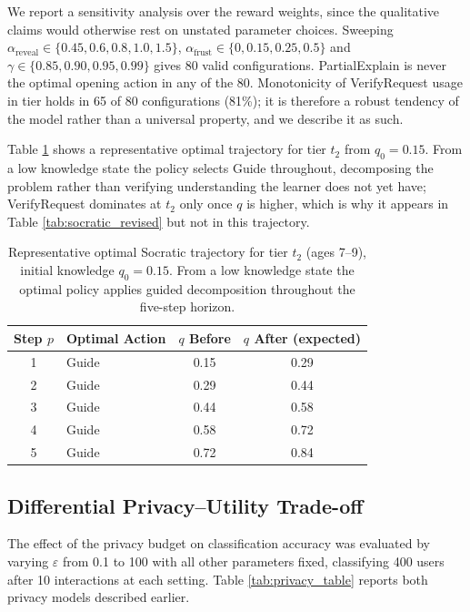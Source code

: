 \documentclass[fleqn,10pt]{wlscirep}
\begin{document}
We report a sensitivity analysis over the reward weights, since the qualitative claims would otherwise rest on unstated parameter choices. Sweeping $\alpha_{\text{reveal}} \in \{0.45, 0.6, 0.8, 1.0, 1.5\}$, $\alpha_{\text{frust}} \in \{0, 0.15, 0.25, 0.5\}$ and $\gamma \in \{0.85, 0.90, 0.95, 0.99\}$ gives 80 valid configurations. PartialExplain is never the optimal opening action in any of the 80. Monotonicity of VerifyRequest usage in tier holds in 65 of 80 configurations (81\%); it is therefore a robust tendency of the model rather than a universal property, and we describe it as such.

Table \ref{tab:socratic_trajectory} shows a representative optimal trajectory for tier $t_2$ from $q_0 = 0.15$. From a low knowledge state the policy selects Guide throughout, decomposing the problem rather than verifying understanding the learner does not yet have; VerifyRequest dominates at $t_2$ only once $q$ is higher, which is why it appears in Table \ref{tab:socratic_revised} but not in this trajectory.

\begin{table}[H]
\centering
\caption{Representative optimal Socratic trajectory for tier $t_2$ (ages 7--9), initial knowledge $q_0 = 0.15$. From a low knowledge state the optimal policy applies guided decomposition throughout the five-step horizon.}
\label{tab:socratic_trajectory}
\small
\begin{tabular}{clcc}
\hline
\textbf{Step $p$} & \textbf{Optimal Action} & \textbf{$q$ Before} & \textbf{$q$ After (expected)} \\
\hline
1 & Guide & 0.15 & 0.29 \\
2 & Guide & 0.29 & 0.44 \\
3 & Guide & 0.44 & 0.58 \\
4 & Guide & 0.58 & 0.72 \\
5 & Guide & 0.72 & 0.84 \\
\hline
\end{tabular}
\end{table}

\subsection*{Differential Privacy--Utility Trade-off}

The effect of the privacy budget on classification accuracy was evaluated by varying $\varepsilon$ from 0.1 to 100 with all other parameters fixed, classifying 400 users after 10 interactions at each setting. Table \ref{tab:privacy_table} reports both privacy models described earlier.
\end{document}
